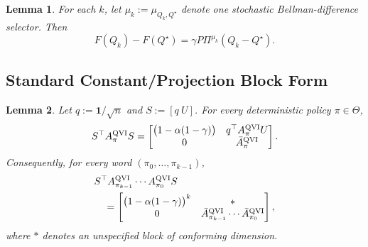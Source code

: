 \documentclass[letterpaper]{article}
\numberwithin{equation}{section}
\newtheorem{lemma}{Lemma}[section]
\begin{document}
\begin{lemma}
\label{lem:bellman_difference_fixed_point_selector}
For each $k$, let $\mu_k:=\mu_{Q_k,Q^\star}$ denote one stochastic
Bellman-difference selector. Then
\begin{equation*}
  F(Q_k)-F(Q^\star)=\gamma P\Pi^{\mu_k}(Q_k-Q^\star).
\end{equation*}
\end{lemma}

\subsection{Standard Constant/Projection Block Form}
\label{app:standard-constant-projection-block-form}

\begin{lemma}
\label{lem:standard-constant-projected-block-form}
Let $q:=\mathbf{1}/\sqrt n$ and $S:=[q\ U]$. For every deterministic policy
$\pi\in\Theta$,
\begin{align*}
  S^\top A_\pi^{\rm QVI}S
  =
  \begin{bmatrix}
    \bigl(1-\alpha(1-\gamma)\bigr)&q^\top A_\pi^{\rm QVI}U\\
    0&\bar A_\pi^{\rm QVI}
  \end{bmatrix}.
\end{align*}
Consequently, for every word $(\pi_0,\ldots,\pi_{k-1})$,
\begin{equation*}
\begin{aligned}
&S^\top A_{\pi_{k-1}}^{\rm QVI}\cdots A_{\pi_0}^{\rm QVI}S\\
&\quad=
  \begin{bmatrix}
    \bigl(1-\alpha(1-\gamma)\bigr)^k&*\\
    0&\bar A_{\pi_{k-1}}^{\rm QVI}\cdots\bar A_{\pi_0}^{\rm QVI}
  \end{bmatrix},
\end{aligned}
\end{equation*}
where $*$ denotes an unspecified block of conforming dimension.
\end{lemma}
\end{document}
